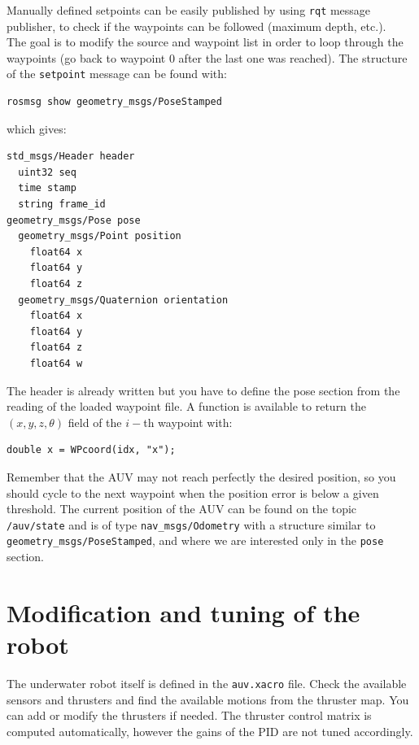 \documentclass{ecnreport}
\begin{document}
Manually defined setpoints can be easily published by using \texttt{rqt} message publisher, to check if the waypoints can be followed (maximum depth, etc.).\\

The goal is to modify the source and waypoint list in order to loop through the waypoints (go back to waypoint 0 after the last one was reached).
The structure of the \texttt{setpoint} message can be found with:
\begin{center}
\begin{lstlisting}
rosmsg show geometry_msgs/PoseStamped
\end{lstlisting}
\end{center}
which gives:
\begin{center}
\begin{lstlisting}
std_msgs/Header header
  uint32 seq
  time stamp
  string frame_id
geometry_msgs/Pose pose
  geometry_msgs/Point position
    float64 x
    float64 y
    float64 z
  geometry_msgs/Quaternion orientation
    float64 x
    float64 y
    float64 z
    float64 w
\end{lstlisting}
\end{center}
The header is already written but you have to define the pose section from the reading of the loaded waypoint file.
A function is available to return the $(x,y,z,\theta)$ field of the $i-$th waypoint with:
\begin{center}\cppstyle
\begin{lstlisting}
double x = WPcoord(idx, "x");
\end{lstlisting}
\end{center}
Remember that the AUV may not reach perfectly the desired position, so you should cycle to the next waypoint when the position error is below a given threshold.
The current position of the AUV can be found on the topic \texttt{/auv/state} and is of type \texttt{nav\_msgs/Odometry} with a structure similar to \texttt{geometry\_msgs/PoseStamped}, and where we are interested only
in the \texttt{pose} section.\\


\section{Modification and tuning of the robot}

The underwater robot itself is defined in the \texttt{auv.xacro} file. Check the available sensors and thrusters and find the available motions from the thruster map.
You can add or modify the thrusters if needed. The thruster control matrix is computed automatically, however the gains of the PID are not tuned accordingly.
\end{document}
